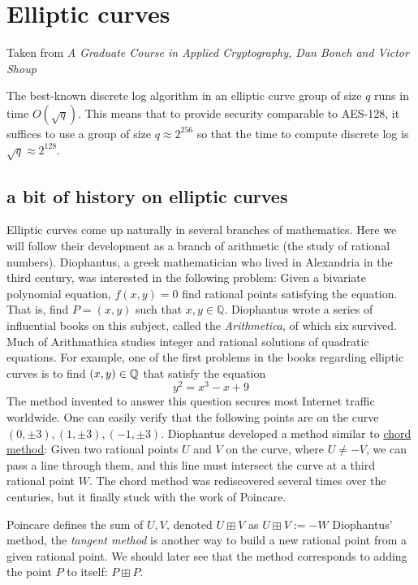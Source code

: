 
\chapter{Elliptic curves}
Taken from \emph{A Graduate Course in Applied Cryptography, Dan Boneh and Victor Shoup}

The best-known discrete log algorithm in an elliptic curve group of size $q$ runs in time $O(\sqrt{q})$. 
This means that to provide security comparable to AES-128, it suffices to use a group of size $q \approx 2^{256}$ 
so that the time to compute discrete log is $\sqrt{q} \approx 2^{128}$.

\section{a bit of history on elliptic curves}
Elliptic curves come up naturally in several branches of mathematics.
Here we will follow their development as a branch of arithmetic (the study of rational numbers).
Diophantus, a greek mathematician who lived in Alexandria in the third century, was interested 
in the following problem: Given a bivariate polynomial equation, $f(x,y)=0$ find 
rational points satisfying the equation. That is, find $P=(x,y)$ such that $x,y\in\mathbb{Q}$.
Diophantus wrote a series of influential books on this subject, called the \emph{Arithmetica}, of which six survived.
Much of Arithmathica studies integer and rational solutions of quadratic equations.
For example, one of the first problems in the books regarding elliptic curves is to find $(x,y) \in \mathbb{Q}$
 that satisfy the equation $$ y^{2}=x^3 - x + 9$$
The method invented to answer this question secures most Internet traffic worldwide.
One can easily verify that the following points are on the curve $(0, \pm3), (1, \pm3), (-1, \pm 3)$.
Diophantus developed a method similar to \underline{chord method}:
Given two rational points $U$ and $V$ on the curve, where $U\neq -V$, we can pass a line through them,
 and this line must intersect the curve at a third rational point $W$. 
The chord method was rediscovered several times over the centuries, but it finally stuck with the work of Poincare.

Poincare defines the sum of $U, V$, denoted $U \boxplus V$ as $U \boxplus V := -W$
Diophantus' method, the \emph{tangent method} is another way to build a new rational point from a given rational point. 
We should later see that the method corresponds to adding the point $P$ to itself: $P\boxplus P$.
